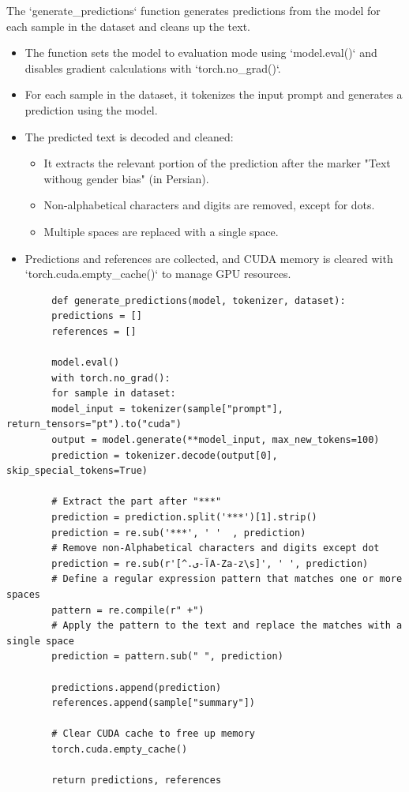 \documentclass{solutionclass} %
\begin{document}
\begin{solution}
	The `generate\_predictions` function generates predictions from the model for each sample in the dataset and cleans up the text.
	
	\begin{itemize}
		\item The function sets the model to evaluation mode using `model.eval()` and disables gradient calculations with `torch.no\_grad()`.
		\item For each sample in the dataset, it tokenizes the input prompt and generates a prediction using the model.
		\item The predicted text is decoded and cleaned:
		\begin{itemize}
			\item It extracts the relevant portion of the prediction after the marker "Text withoug gender bias" (in Persian).
			\item Non-alphabetical characters and digits are removed, except for dots.
			\item Multiple spaces are replaced with a single space.
		\end{itemize}
		\item Predictions and references are collected, and CUDA memory is cleared with `torch.cuda.empty\_cache()` to manage GPU resources.
	\end{itemize}
	\begin{lstlisting}
		def generate_predictions(model, tokenizer, dataset):
		predictions = []
		references = []
		
		model.eval()
		with torch.no_grad():
		for sample in dataset:
		model_input = tokenizer(sample["prompt"], return_tensors="pt").to("cuda")
		output = model.generate(**model_input, max_new_tokens=100)
		prediction = tokenizer.decode(output[0], skip_special_tokens=True)
		
		# Extract the part after "***"
		prediction = prediction.split('***')[1].strip()
		prediction = re.sub('***', ' '  , prediction)
		# Remove non-Alphabetical characters and digits except dot
		prediction = re.sub(r'[^.آ-یA-Za-z\s]', ' ', prediction)
		# Define a regular expression pattern that matches one or more spaces
		pattern = re.compile(r" +")
		# Apply the pattern to the text and replace the matches with a single space
		prediction = pattern.sub(" ", prediction)
		
		predictions.append(prediction)
		references.append(sample["summary"])
		
		# Clear CUDA cache to free up memory
		torch.cuda.empty_cache()
		
		return predictions, references
	\end{lstlisting}
\end{solution}
\end{document}
